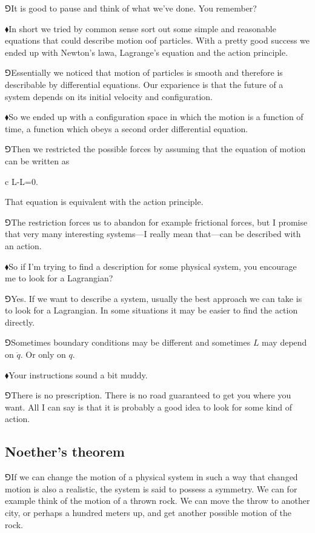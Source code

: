 \documentclass[11pt,oneside%
]{memoir}
\newenvironment{eqna}{\begin{IEEEeqnarray*}{c}}{\end{IEEEeqnarray*}\ignorespacesafterend}
\newcommand{\der}[2]{\frac{\dd#1}{\dd#2}}
\newcommand{\dd}{\mathrm{d}}
\newcommand{\hea}{\(\blacklozenge\)\;}
\newcommand{\heb}{\(\Game\)\;}
\begin{document}
\heb It is good to pause and think of what we've done. You remember?

\hea In short we tried by common sense sort out some simple and reasonable equations that could describe motion oof particles. With a pretty good success we ended up with Newton's lawa, Lagrange's equation and the action principle.

\heb Essentially we noticed that motion of particles is smooth and therefore is describable by differential equations. Our exparience is that the future of a system depends on its initial velocity and configuration.

\hea So we ended up with a configuration space in which the motion is a function of time, a function which obeys a second order differential equation.

\heb Then we restricted the possible forces by assuming that the equation of motion can be written as
\begin{eqna}
    \der{}{t}\dot{\nabla}L-\nabla L=0.
\end{eqna}
That equation is equivalent with the action principle.

\heb The restriction forces us to abandon for example frictional forces, but I promise that very many interesting systems---I really mean that---can be described with an action.

\hea So if I'm trying to find a description for some physical system, you encourage me to look for a Lagrangian?

\heb Yes. If we want to describe a system, usually the best approach we can take is to look for a Lagrangian. In some situations it may be easier to find the action directly.

\heb Sometimes boundary conditions may be different and sometimes \(L\) may depend on \(\ddot{q}\). Or only on \(q\).

\hea Your instructions sound a bit muddy.

\heb There is no prescription. There is no road guaranteed to get you where you want. All I can say is that it is probably a good idea to look for some kind of action.
\subsection{Noether's theorem}
\heb If we can change the motion of a physical system in such a way that changed motion is also a realistic, the system is said to possess a symmetry. We can for example think of the motion of a thrown rock. We can move the throw to another city, or perhaps a hundred meters up, and get another possible motion of the rock.
\end{document}
